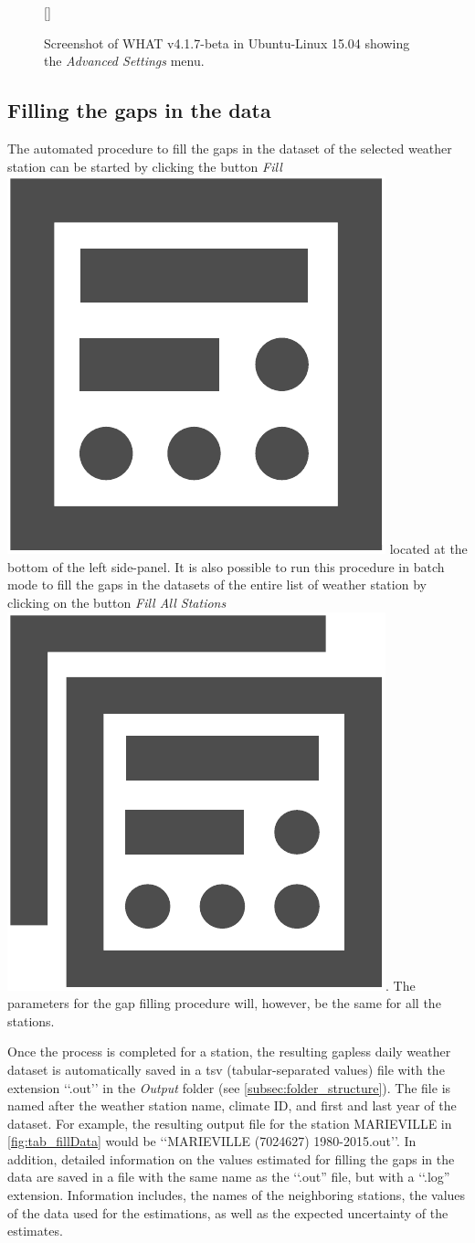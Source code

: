\documentclass[WHATMANUAL.tex]{subfiles}
\begin{document}
\begin{figure}[!ht]
    \setlength{\fboxsep}{0pt}
    [\FBwidth]
	{
	 \caption{Screenshot of WHAT v4.1.7-beta in Ubuntu-Linux 15.04 showing the \emph{Advanced Settings} menu.}
	 \label{fig:adv_settings}
	}
	{
	}
\end{figure}

\subsection{Filling the gaps in the data}\label{subsec:filling_the_gaps}

The automated procedure to fill the gaps in the dataset of the selected weather station can be started by clicking the button \emph{Fill}~{\includegraphics[height=2ex]{img/fill_data}} located at the bottom of the left side-panel. It is also possible to run this procedure in batch mode to fill the gaps in the datasets of the entire list of weather station by clicking on the button \emph{Fill All Stations}~{\includegraphics[height=2ex]{img/fill_all_data}}. The parameters for the gap filling procedure will, however, be the same for all the stations.

Once the process is completed for a station, the resulting gapless daily weather dataset is automatically saved in a tsv (tabular-separated values) file with the extension ‘‘.out’’ in the \emph{Output} folder (see \cref{subsec:folder_structure}). The file is named after the weather station name, climate ID, and first and last year of the dataset. For example, the resulting output file for the station MARIEVILLE in \cref{fig:tab_fillData} would be ‘‘MARIEVILLE (7024627) 1980-2015.out’’.  In addition, detailed information on the values estimated for filling the gaps in the data are saved in a file with the same name as the ‘‘.out'' file, but with a ‘‘.log'' extension. Information includes, the names of the neighboring stations, the values of the data used for the estimations, as well as the expected uncertainty of the estimates.
\end{document}
